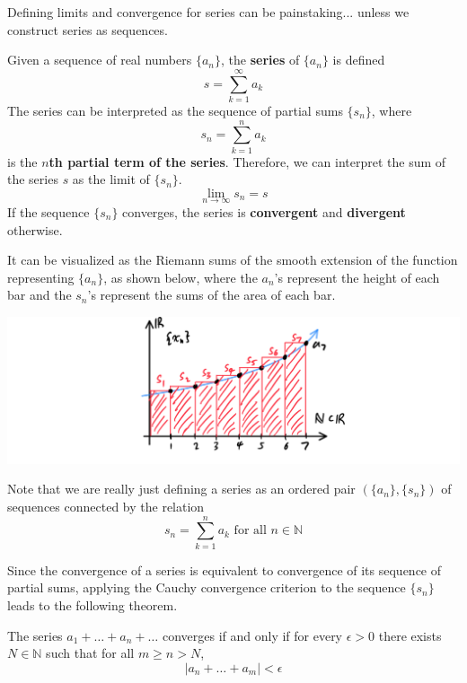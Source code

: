 \documentclass{article}
\begin{document}
      Defining limits and convergence for series can be painstaking... unless we construct series as sequences. 

      \begin{definition}
        Given a sequence of real numbers $\{a_n\}$, the \textbf{series} of $\{a_n\}$ is defined
        \[s = \sum_{k=1}^\infty a_k\]
        The series can be interpreted as the sequence of partial sums $\{s_n\}$, where
        \[s_n = \sum_{k=1}^n a_k\]
        is the \textbf{$n$th partial term of the series}. Therefore, we can interpret the sum of the series $s$ as the limit of $\{s_n\}$. 
        \[\lim_{n \rightarrow \infty} s_n = s\]
        If the sequence $\{s_n\}$ converges, the series is \textbf{convergent} and \textbf{divergent} otherwise. 
      \end{definition}

      It can be visualized as the Riemann sums of the smooth extension of the function representing $\{a_n\}$, as shown below, where the $a_n$'s represent the height of each bar and the $s_n$'s represent the sums of the area of each bar. 
      \begin{center}
          \includegraphics[scale=0.3]{img/Series_as_Riemann_Sums.PNG}
      \end{center}
      Note that we are really just defining a series as an ordered pair $(\{a_n\}, \{s_n\})$ of sequences connected by the relation 
      \[s_n = \sum_{k=1}^n a_k \text{ for all } n \in \mathbb{N}\]

      Since the convergence of a series is equivalent to convergence of its sequence of partial sums, applying the Cauchy convergence criterion to the sequence $\{s_n\}$ leads to the following theorem. 

      \begin{theorem}
      The series $a_1 + \ldots + a_n + \ldots$ converges if and only if for every $\epsilon > 0$ there exists $N \in \mathbb{N}$ such that for all $m \geq n > N$, 
      \[|a_n + \ldots + a_m| < \epsilon\]
      \end{theorem}
\end{document}
